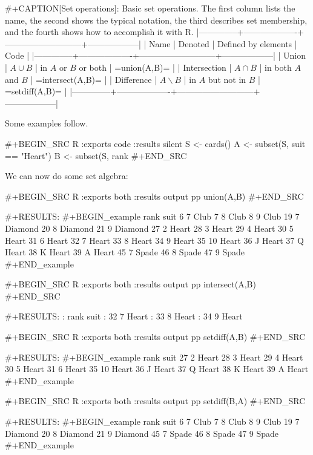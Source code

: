 #+CAPTION[Set operations]: Basic set operations.  The first column lists the name, the second shows the typical notation, the third describes set membership, and the fourth shows how to accomplish it with R.
|--------------+-------------------+---------------------------+------------------|
| Name         | Denoted           | Defined by elements       | Code             |
|--------------+-------------------+---------------------------+------------------|
| Union        | \(A\cup B\)       | in \(A\) or \(B\) or both | =union(A,B)=     |
| Intersection | \(A\cap B\)       | in both \(A\) and \(B\)   | =intersect(A,B)= |
| Difference   | \(A\backslash B\) | in \(A\) but not in \(B\) | =setdiff(A,B)=   |
|--------------+-------------------+---------------------------+------------------|

Some examples follow. 

#+BEGIN_SRC R :exports code :results silent
S <- cards() 
A <- subset(S, suit == "Heart") 
B <- subset(S, rank %
#+END_SRC 

We can now do some set algebra: 

#+BEGIN_SRC R :exports both :results output pp  
union(A,B)
#+END_SRC

#+RESULTS:
#+BEGIN_example
   rank    suit
6     7    Club
7     8    Club
8     9    Club
19    7 Diamond
20    8 Diamond
21    9 Diamond
27    2   Heart
28    3   Heart
29    4   Heart
30    5   Heart
31    6   Heart
32    7   Heart
33    8   Heart
34    9   Heart
35   10   Heart
36    J   Heart
37    Q   Heart
38    K   Heart
39    A   Heart
45    7   Spade
46    8   Spade
47    9   Spade
#+END_example

#+BEGIN_SRC R :exports both :results output pp  
intersect(A,B)
#+END_SRC 

#+RESULTS:
:    rank  suit
: 32    7 Heart
: 33    8 Heart
: 34    9 Heart

#+BEGIN_SRC R :exports both :results output pp  
setdiff(A,B)
#+END_SRC

#+RESULTS:
#+BEGIN_example
   rank  suit
27    2 Heart
28    3 Heart
29    4 Heart
30    5 Heart
31    6 Heart
35   10 Heart
36    J Heart
37    Q Heart
38    K Heart
39    A Heart
#+END_example

#+BEGIN_SRC R :exports both :results output pp  
setdiff(B,A) 
#+END_SRC 

#+RESULTS:
#+BEGIN_example
   rank    suit
6     7    Club
7     8    Club
8     9    Club
19    7 Diamond
20    8 Diamond
21    9 Diamond
45    7   Spade
46    8   Spade
47    9   Spade
#+END_example

